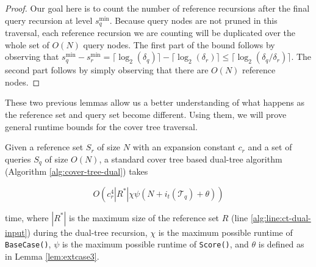 \begin{proof}
Our goal here is to count the number of reference recursions after the final
query recursion at level $s_q^{\min}$.  Because query nodes are not pruned in
this traversal, each reference recursion we are counting will be duplicated over
the whole set of $O(N)$ query nodes.  The first part of the bound follows by
observing that $s_q^{\min} - s_r^{\min} = \lceil \log_2(\delta_q) \rceil -
\lceil \log_2(\delta_r) \rceil \le \lceil \log_2(\delta_q / \delta_r) \rceil$.
The second part follows by simply observing that there are $O(N)$ reference
nodes.
\end{proof}

These two previous lemmas allow us a better understanding of what happens as the
reference set and query set become different.  Using them, we will prove general
runtime bounds for the cover tree traversal.

\begin{thm}
\label{thm:ct-runtime}
Given a reference set $S_r$ of size $N$ with an expansion constant $c_r$ and a
set of queries $S_q$ of size $O(N)$, a standard cover tree based dual-tree
algorithm (Algorithm \ref{alg:cover-tree-dual}) takes

\begin{equation}
O\left(c_r^4 | R^* | \chi \psi (N + i_t(\mathscr{T}_q) + \theta)\right)
\end{equation}

\noindent time, where $ | R^* | $ is the maximum size of the reference set $R$
(line \ref{alg:line:ct-dual-input}) during the dual-tree recursion, $\chi$ is
the maximum possible runtime of \texttt{BaseCase()}, $\psi$ is the maximum
possible runtime of \texttt{Score()}, and $\theta$ is defined as in Lemma
\ref{lem:extcase3}.
\end{thm}

